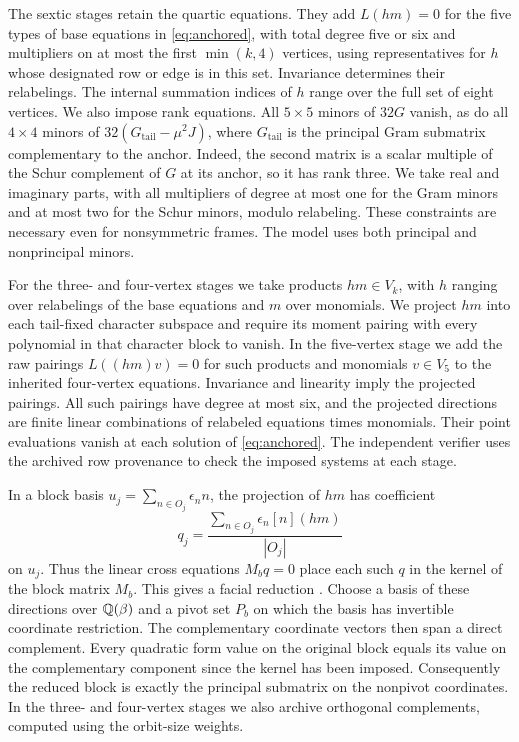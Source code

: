 The sextic stages retain the quartic equations. They add $L(hm)=0$ for the five types of base equations in \eqref{eq:anchored}, with total degree five or six and multipliers on at most the first $\min(k,4)$ vertices, using representatives for $h$ whose designated row or edge is in this set. Invariance determines their relabelings. The internal summation indices of $h$ range over the full set of eight vertices. We also impose rank equations. All $5\times5$ minors of $32G$ vanish, as do all $4\times4$ minors of $32(G_{\mathrm{tail}}-\mu^2 J)$, where $G_{\mathrm{tail}}$ is the principal Gram submatrix complementary to the anchor. Indeed, the second matrix is a scalar multiple of the Schur complement of $G$ at its anchor, so it has rank three. We take real and imaginary parts, with all multipliers of degree at most one for the Gram minors and at most two for the Schur minors, modulo relabeling. These constraints are necessary even for nonsymmetric frames. The model uses both principal and nonprincipal minors.

For the three- and four-vertex stages we take products $hm\in V_k$, with $h$ ranging over relabelings of the base equations and $m$ over monomials. We project $hm$ into each tail-fixed character subspace and require its moment pairing with every polynomial in that character block to vanish. In the five-vertex stage we add the raw pairings $L((hm)v)=0$ for such products and monomials $v\in V_5$ to the inherited four-vertex equations. Invariance and linearity imply the projected pairings. All such pairings have degree at most six, and the projected directions are finite linear combinations of relabeled equations times monomials. Their point evaluations vanish at each solution of \eqref{eq:anchored}. The independent verifier uses the archived row provenance to check the imposed systems at each stage.

In a block basis $u_j=\sum_{n\in O_j}\epsilon_n n$, the projection of $hm$ has coefficient
\[
 q_j=\frac{\sum_{n\in O_j}\epsilon_n[n](hm)}{|O_j|}
\]
on $u_j$. Thus the linear cross equations $M_b q=0$ place each such $q$ in the kernel of the block matrix $M_b$. This gives a facial reduction \cite{borweinwolkowicz}. Choose a basis of these directions over $\mathbb Q(\beta)$ and a pivot set $P_b$ on which the basis has invertible coordinate restriction. The complementary coordinate vectors then span a direct complement. Every quadratic form value on the original block equals its value on the complementary component since the kernel has been imposed. Consequently the reduced block is exactly the principal submatrix on the nonpivot coordinates. In the three- and four-vertex stages we also archive orthogonal complements, computed using the orbit-size weights.

